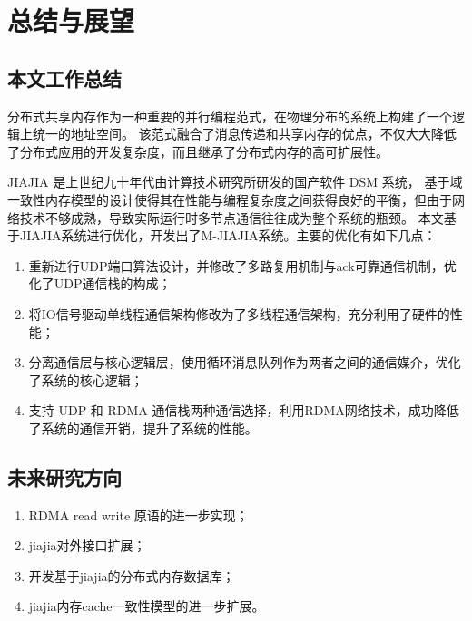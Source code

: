 \chapter{总结与展望}\label{chap:summary}{
    \section{本文工作总结}
    分布式共享内存作为一种重要的并行编程范式，在物理分布的系统上构建了一个逻辑上统一的地址空间。
    该范式融合了消息传递和共享内存的优点，不仅大大降低了分布式应用的开发复杂度，而且继承了分布式内存的高可扩展性。

    JIAJIA 是上世纪九十年代由计算技术研究所研发的国产软件 DSM 系统，
    基于域一致性内存模型的设计使得其在性能与编程复杂度之间获得良好的平衡，但由于网络技术不够成熟，导致实际运行时多节点通信往往成为整个系统的瓶颈。
    本文基于JIAJIA系统进行优化，开发出了M-JIAJIA系统。主要的优化有如下几点：
    \begin{enumerate}
        \item 重新进行UDP端口算法设计，并修改了多路复用机制与ack可靠通信机制，优化了UDP通信栈的构成；
        \item 将IO信号驱动单线程通信架构修改为了多线程通信架构，充分利用了硬件的性能；
        \item 分离通信层与核心逻辑层，使用循环消息队列作为两者之间的通信媒介，优化了系统的核心逻辑；
        \item 支持 UDP 和 RDMA 通信栈两种通信选择，利用RDMA网络技术，成功降低了系统的通信开销，提升了系统的性能。
    \end{enumerate}

    \section{未来研究方向}

    \begin{enumerate}
        \item RDMA read write 原语的进一步实现；
        \item jiajia对外接口扩展；
        \item 开发基于jiajia的分布式内存数据库；
        \item jiajia内存cache一致性模型的进一步扩展。
    \end{enumerate}
}